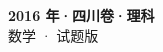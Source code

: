 \documentclass[zihao=-4, a4paper]{ctexart}
\begin{document}
\begin{center}
  {\Large\bfseries 2016 年·四川卷·理科}\\[4pt]
  {\large 数学 · 试题版}
\end{center}
\medskip
{}

\end{document}
